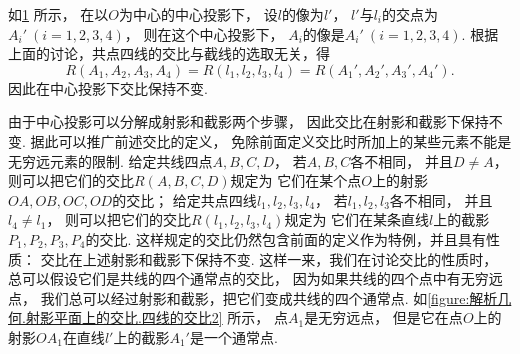 \begin{figure}[hbt]
	\centering
	\caption{}
	\label{figure:解析几何.射影平面上的交比.四线的交比1}
\end{figure}

如\cref{figure:解析几何.射影平面上的交比.四线的交比1} 所示，
在以\(O\)为中心的中心投影下，
设\(l\)的像为\(l'\)，
\(l'\)与\(l_i\)的交点为\(A_i'\ (i=1,2,3,4)\)，
则在这个中心投影下，
\(A_i\)的像是\(A_i'\ (i=1,2,3,4)\).
根据上面的讨论，共点四线的交比与截线的选取无关，得\begin{equation*}
	R(A_1,A_2,A_3,A_4)
	= R(l_1,l_2,l_3,l_4)
	= R(A_1',A_2',A_3',A_4').
\end{equation*}
因此在中心投影下交比保持不变.

由于中心投影可以分解成射影和截影两个步骤，
因此交比在射影和截影下保持不变.
据此可以推广前述交比的定义，
免除前面定义交比时所加上的某些元素不能是无穷远元素的限制.
给定共线四点\(A,B,C,D\)，
若\(A,B,C\)各不相同，
并且\(D \neq A\)，
则可以把它们的交比\(R(A,B,C,D)\)规定为
它们在某个点\(O\)上的射影\(OA,OB,OC,OD\)的交比；
给定共点四线\(l_1,l_2,l_3,l_4\)，
若\(l_1,l_2,l_3\)各不相同，
并且\(l_4 \neq l_1\)，
则可以把它们的交比\(R(l_1,l_2,l_3,l_4)\)规定为
它们在某条直线\(l\)上的截影\(P_1,P_2,P_3,P_4\)的交比.
这样规定的交比仍然包含前面的定义作为特例，并且具有性质：
交比在上述射影和截影下保持不变.
这样一来，我们在讨论交比的性质时，
总可以假设它们是共线的四个通常点的交比，
因为如果共线的四个点中有无穷远点，
我们总可以经过射影和截影，把它们变成共线的四个通常点.
如\cref{figure:解析几何.射影平面上的交比.四线的交比2} 所示，
点\(A_1\)是无穷远点，
但是它在点\(O\)上的射影\(OA_1\)在直线\(l'\)上的截影\(A_1'\)是一个通常点.

